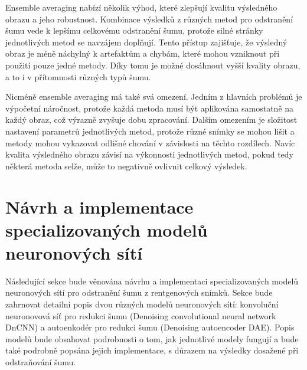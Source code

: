 \documentclass[male,czech,api_ing]{thesis}
\begin{document}
Ensemble averaging nabízí několik výhod, které zlepšují kvalitu výsledného obrazu a jeho robustnost. Kombinace výsledků z různých metod pro odstranění šumu vede k lepšímu celkovému odstranění šumu, protože silné stránky jednotlivých metod se navzájem doplňují. Tento přístup zajišťuje, že výsledný obraz je méně náchylný k artefaktům a chybám, které mohou vzniknout při použití pouze jedné metody. Díky tomu je možné dosáhnout vyšší kvality obrazu, a to i v přítomnosti různých typů šumu.

Nicméně ensemble averaging má také svá omezení. Jedním z hlavních problémů je výpočetní náročnost, protože každá metoda musí být aplikována samostatně na každý obraz, což výrazně zvyšuje dobu zpracování. Dalším omezením je složitost nastavení parametrů jednotlivých metod, protože různé snímky se mohou lišit a metody mohou vykazovat odlišné chování v závislosti na těchto rozdílech. Navíc kvalita výsledného obrazu závisí na výkonnosti jednotlivých metod, pokud tedy některá metoda selže, může to negativně ovlivnit celkový výsledek.

\section{Návrh a implementace specializovaných modelů neuronových sítí}
Následující sekce bude věnována návrhu a implementaci specializovaných modelů neuronových sítí pro odstranění šumu z rentgenových snímků. Sekce bude zahrnovat detailní popis dvou různých modelů neuronových sítí: konvoluční neuronovová síť pro redukci šumu (Denoising convolutional neural network DnCNN) a autoenkodér pro redukci šumu (Denoising autoencoder DAE). Popis modelů bude obsahovat podrobnosti o tom, jak jednotlivé modely fungují a bude také podrobně popsána jejich implementace, s důrazem na výsledky dosažené při odstraňování šumu.



\end{document}
